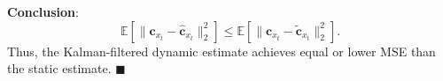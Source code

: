 \documentclass[journal,twoside,web]{ieeecolor}
\begin{document}
\textbf{Conclusion}:  
\begin{equation}  
\mathbb{E}\left[ \| \mathbf{c}_{x_t} - \mathbf{\hat c}_{x_t} \|_2^2 \right] \leq \mathbb{E}\left[ \| \mathbf{c}_{x_t} - \mathbf{\tilde c}_{x_t} \|_2^2 \right].  
\end{equation}  
Thus, the Kalman-filtered dynamic estimate achieves equal or lower MSE than the static estimate.  
\(\blacksquare\) 
 

\end{document}

